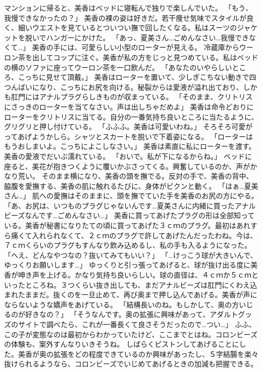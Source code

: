 マンションに帰ると、美香はベッドに寝転んで独りで楽しんでいた。
「もう、我慢できなかったの？」
美香の裸の姿は好きだ。若干痩せ気味でスタイルが良く、細いウエストを見ているとついつい撫で回したくなる。私はスーツのジャケットを脱いでハンガーにかけた。
「あっ、夏美さん…ごめんなさい…我慢できなくて…」
美香の手には、可愛らしい小型のローターが見える。
冷蔵庫からウーロン茶を出してコップに注ぐ。美香が私の方をじっと見つめている。私はベッドの横のソファに座ってウーロン茶を一口飲んだ。
「あなたのいやらしいところ、こっちに見せて頂戴。」
美香はローターを置いて、少しぎこちない動きで四つんばいになり、こっちにお尻を向ける。秘裂からは愛液が溢れ出ており、しかも肛門にはアナルプラグらしきものが収まっている。
「そのまま、クリトリスにさっきのローターを当てなさい。声は出しちゃだめよ」
美香は命令どおりにローターをクリトリスに当てる。自分の一番気持ち良いところに当たるように、グリグリと押し付けている。
「ふふふ。美香は可愛いわね。」
そろそろ可愛がってあげようかしら。シャツとスカートを脱いで下着姿になる。
「ローターはもうおしまいよ。こっちによこしなさい。」
美香は素直に私にローターを渡す。美香の愛液でだいぶ濡れている。
「おいで。私が下になるからね。」
ベッドに座ると、美花が抱きつくように覆いかぶさってくる。興奮しているのか、声がかなり荒い。
そのまま横になり、美香の頭を撫でる。反対の手で、美香の背中、脇腹を愛撫する、美香の肌に触れるたびに、身体がピクンと動く。
「はぁ…夏美さん…」
肌への愛撫はそのままに、頭を撫でていた手を美香のお尻の方にやる。
「あ、お尻は、いつものプラグじゃないんです…夏美さんに内緒に買ったアナルビーズなんです…ごめんなさい…」
美香に買ってあげたプラグの形は全部知っている。美香が秘書になりたての頃に買ってあげた３ｃｍのプラグ。最初はあれすら痛くて入れられなくて、２ｃｍのプラグで許してあげたんだったわね。今は、７ｃｍくらいのプラグもすんなり飲み込めるし、私の手も入るようになった。
「へえ、どんなやつなの？抜いてみてもいい？」
「…けっこう球が大きいんで、ゆっくりお願いします…」
ゆっくりと引っ張ってあげると、球が抜け出る度に美香が呻き声を上げる。かなり気持ち良いらしい。球の直径は、４ｃｍか５ｃｍといったところね。３つくらい抜き出しても、まだアナルビーズは肛門にくわえ込まれたままだ。抜くのを一旦止めて、再び奥まで押し込んであげる。美香が声にならないような嬌声をあげている。
「結構長いのね。もしかして、奥の方いじるのが好きなの？」
「そうなんです。奥の拡張に興味があって、アダルトグッズのサイトで調べたら、これが一番長くて良さそうだったので…つい…」
ふふ、この子が変態なのは最初からわかっていたけど、ここまでとはね。コロンビーズの体験も、案外すんなりいきそうね。
しばらくピストンしてあげることにした。美香が奥の拡張をどの程度できているのか興味があったし、Ｓ字結腸を楽々抜けられるようなら、コロンビーズでいじめてあげるときの加減も把握できる。
